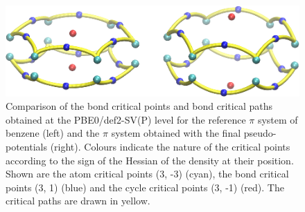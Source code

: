 \documentclass[12pt]{article}
\begin{document}
\begin{figure}
\begin{center}
\includegraphics[width=12cm]{aim_c6h6.eps}
\end{center}
\vspace{0.25in}
\hspace*{3in}
\caption{Comparison of the bond critical points and bond critical paths obtained at the PBE0/def2-SV(P)
level for the
reference $\pi$ system of benzene (left) and the $\pi$ system obtained with the final pseudo-potentials (right). Colours indicate the nature of the critical points according to the sign of the Hessian
of the density at their position. Shown are the atom critical points (3, -3) (cyan), the bond critical points (3, 1) (blue) and the cycle critical points (3, -1) (red). The critical paths are drawn in yellow.}
\label{fig:aim_c6h6}
\end{figure}
\end{document}
